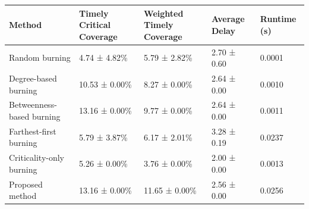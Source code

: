 \begin{tabular}{lllll}
\toprule
Method & Timely Critical Coverage & Weighted Timely Coverage & Average Delay & Runtime (s) \\
\midrule
Random burning &  4.74 ± 4.82\% &  5.79 ± 2.82\% & 2.70 ± 0.60 & 0.0001 \\
Degree-based burning & 10.53 ± 0.00\% &  8.27 ± 0.00\% & 2.64 ± 0.00 & 0.0010 \\
Betweenness-based burning & 13.16 ± 0.00\% &  9.77 ± 0.00\% & 2.64 ± 0.00 & 0.0011 \\
Farthest-first burning &  5.79 ± 3.87\% &  6.17 ± 2.01\% & 3.28 ± 0.19 & 0.0237 \\
Criticality-only burning &  5.26 ± 0.00\% &  3.76 ± 0.00\% & 2.00 ± 0.00 & 0.0013 \\
Proposed method & 13.16 ± 0.00\% & 11.65 ± 0.00\% & 2.56 ± 0.00 & 0.0256 \\
\bottomrule
\end{tabular}

